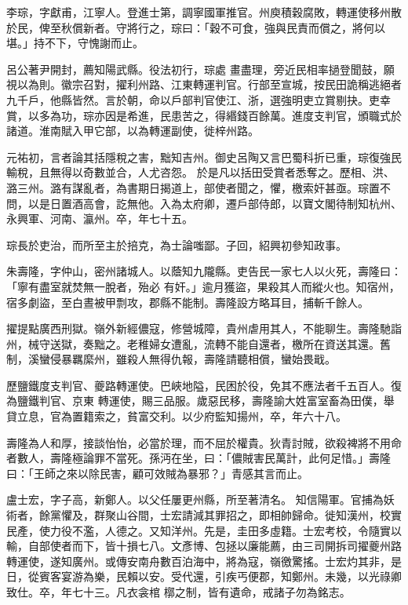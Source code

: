 \begin{pinyinscope}
 李琮，字獻甫，江寧人。登進士第，調寧國軍推官。州庾積穀腐敗，轉運使移州散於民，俾至秋償新者。守將行之，琮曰：「穀不可食，強與民責而償之，將何以堪。」持不下，守愧謝而止。



 呂公著尹開封，薦知陽武縣。役法初行，琮處
 畫盡理，旁近民相率撾登聞鼓，願視以為則。徽宗召對，擢利州路、江東轉運判官。行部至宣城，按民田詭稱逃絕者九千戶，他縣皆然。言於朝，命以戶部判官使江、浙，選強明吏立賞剔抉。吏幸賞，以多為功，琮亦因是希進，民患苦之，得緡錢百餘萬。進度支判官，頒職式於諸道。淮南賦入甲它部，以為轉運副使，徙梓州路。



 元祐初，言者論其括隱稅之害，黜知吉州。御史呂陶又言巴蜀科折已重，琮復強民輸稅，且無得以奇數並合，人尤咨怨。
 於是凡以括田受賞者悉奪之。歷相、洪、潞三州。潞有謀亂者，為書期日揭道上，部使者聞之，懼，檄索奸甚亟。琮置不問，以是日置酒高會，訖無他。入為太府卿，遷戶部侍郎，以寶文閣待制知杭州、永興軍、河南、瀛州。卒，年七十五。



 琮長於吏治，而所至主於掊克，為士論嗤鄙。子回，紹興初參知政事。



 朱壽隆，字仲山，密州諸城人。以蔭知九隴縣。吏告民一家七人以火死，壽隆曰：「寧有盡室就焚無一脫者，殆必
 有奸。」逾月獲盜，果殺其人而縱火也。知宿州，宿多劇盜，至白晝被甲剽攻，郡縣不能制。壽隆設方略耳目，捕斬千餘人。



 擢提點廣西刑獄。嶺外新經儂寇，修營城障，貴州虐用其人，不能聊生。壽隆馳詣州，械守送獄，奏黜之。老稚婦女遭亂，流轉不能自還者，檄所在資送其還。舊制，溪蠻侵暴羈縻州，雖殺人無得仇報，壽隆請聽相償，蠻始畏戢。



 歷鹽鐵度支判官、夔路轉運使。巴峽地隘，民困於役，免其不應法者千五百人。復為鹽鐵判官、京東
 轉運使，賜三品服。歲惡民移，壽隆諭大姓富室畜為田僕，舉貸立息，官為置籍索之，貧富交利。以少府監知揚州，卒，年六十八。



 壽隆為人和厚，接談怡怡，必當於理，而不屈於權貴。狄青討賊，欲殺裨將不用命者數人，壽隆極論罪不當死。孫沔在坐，曰：「儂賊害民萬計，此何足惜。」壽隆曰：「王師之來以除民害，顧可效賊為暴邪？」青感其言而止。



 盧士宏，字子高，新鄭人。以父任屢更州縣，所至著清名。
 知信陽軍。官捕為妖術者，餘黨懼及，群聚山谷間，士宏請減其罪招之，即相帥歸命。徙知漢州，校實民產，使力役不濫，人德之。又知洋州。先是，圭田多虛籍。士宏考校，令隨實以輸，自部使者而下，皆十損七八。文彥博、包拯以廉能薦，由三司開拆司擢夔州路轉運使，遂知廣州。或傳安南舟數百泊海中，將為寇，嶺徼驚搖。士宏灼其非，是日，從賓客宴游為樂，民賴以安。受代還，引疾丐便郡，知鄭州。未幾，以光祿卿致仕。卒，年七十三。凡衣衾棺
 槨之制，皆有遺命，戒諸子勿為銘志。




\end{pinyinscope}
